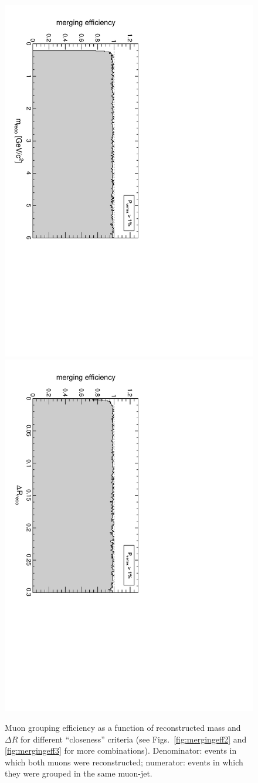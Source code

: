 \documentclass[12pt]{article}
\begin{document}
\begin{figure}[p]
\includegraphics[height=0.5\linewidth, angle=90]{fig/acceptance2_plot/mergingeff_recomass_GroupByVertexProb.pdf}
\includegraphics[height=0.5\linewidth, angle=90]{fig/acceptance2_plot/mergingeff_recodr_GroupByVertexProb.pdf}
\caption{Muon grouping efficiency as a function of reconstructed mass
  and $\Delta R$ for different ``closeness'' criteria (see
  Figs.~\ref{fig:mergingeff2} and \ref{fig:mergingeff3} for more
  combinations).  Denominator: events in which both muons were
  reconstructed; numerator: events in which they were grouped in the
  same muon-jet. \label{fig:mergingeff1}}
\end{figure}
\end{document}

